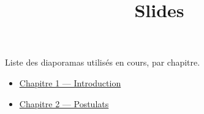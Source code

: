 \documentclass[
  french,
  12pt,
]{article}
\title{Slides}
\author{}
\date{}
\providecommand{\tightlist}{%
  \setlength{\itemsep}{0pt}\setlength{\parskip}{0pt}}
\begin{document}
\maketitle


Liste des diaporamas utilisés en cours, par chapitre.

\begin{itemize}
\tightlist
\item
  \href{chap1.qmd}{Chapitre 1 --- Introduction}
\item
  \href{chap2.qmd}{Chapitre 2 --- Postulats}
\end{itemize}
\end{document}
